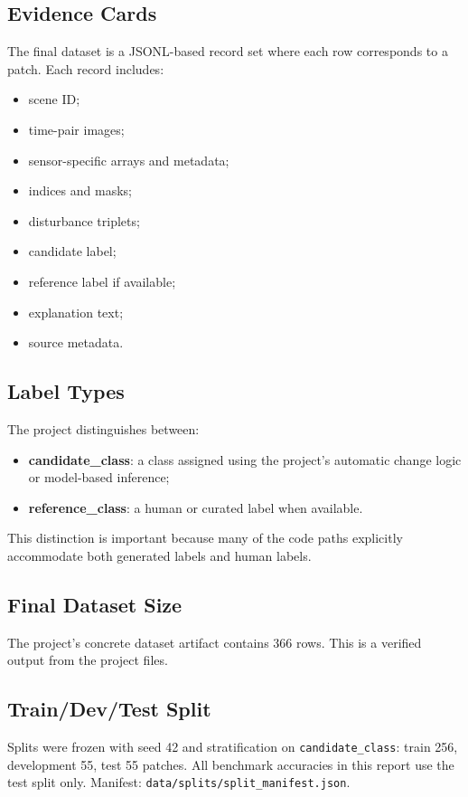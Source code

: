 \documentclass[11pt]{article}
\begin{document}
\subsection{Evidence Cards}
The final dataset is a JSONL-based record set where each row corresponds to a patch. Each record includes:
\begin{itemize}
    \item scene ID;
    \item time-pair images;
    \item sensor-specific arrays and metadata;
    \item indices and masks;
    \item disturbance triplets;
    \item candidate label;
    \item reference label if available;
    \item explanation text;
    \item source metadata.
\end{itemize}

\subsection{Label Types}
The project distinguishes between:
\begin{itemize}
    \item \textbf{candidate\_class}: a class assigned using the project’s automatic change logic or model-based inference;
    \item \textbf{reference\_class}: a human or curated label when available.
\end{itemize}

This distinction is important because many of the code paths explicitly accommodate both generated labels and human labels.

\subsection{Final Dataset Size}
The project’s concrete dataset artifact contains 366 rows. This is a verified output from the project files.

\subsection{Train/Dev/Test Split}
Splits were frozen with seed 42 and stratification on \texttt{candidate\_class}: train 256, development 55, test 55 patches. All benchmark accuracies in this report use the test split only. Manifest: \texttt{data/splits/split\_manifest.json}.
\end{document}
